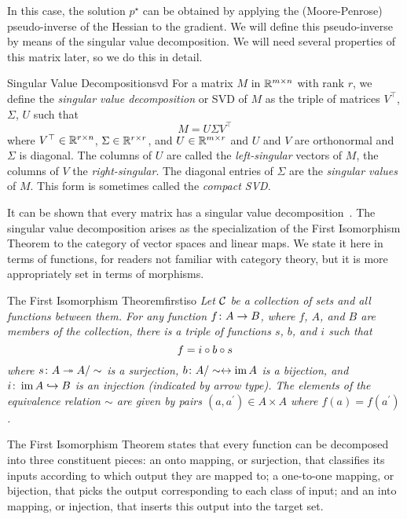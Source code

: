 \documentclass[../../thesis.tex]{subfiles}
\begin{document}
In this case, the solution $p^\star$
can be obtained by applying the
(Moore-Penrose) pseudo-inverse of the Hessian
to the gradient.
We will define this pseudo-inverse
by means of the singular value decomposition.
We will need several properties
of this matrix later,
so we do this in detail.

\begin{definition}{Singular Value Decomposition}{svd}
	For a matrix $M$ in $\mathbb{R}^{m \times n}$
	with rank $r$,
	we define the
	\emph{singular value decomposition} or SVD of $M$
	as the triple of matrices $V^\top$, $\Sigma$, $U$
	such that
	\begin{equation}
		M = U \Sigma V^\top
	\end{equation}
	where $V^\top \in \mathbb{R}^{r \times n}$,
	$\Sigma \in \mathbb{R}^{r \times r}$, and
	$U \in \mathbb{R}^{m \times r}$
	and $U$ and $V$ are orthonormal
	and $\Sigma$ is diagonal.
	The columns of $U$ are called the \emph{left-singular}
	vectors of $M$, the columns of $V$ the \emph{right-singular}.
	The diagonal entries of $\Sigma$ are the \emph{singular values} of $M$.
	This form is sometimes called the \emph{compact SVD}.
\end{definition}

It can be shown that every matrix has a
singular value decomposition~\cite{strang1993}.
The singular value decomposition arises
as the specialization of the First Isomorphism Theorem
to the category of vector spaces and linear maps.
We state it here in terms of functions,
for readers not familiar with category theory,
but it is more appropriately set in terms of morphisms.

\begin{theorem}{The First Isomorphism Theorem}{firstiso}
	\emph{Let ${\mathcal{C}}$ be a collection of sets and all functions between them.
	For any function $f\colon A \to B$, where $f$, $A$, and $B$ are members of the collection,
	there is a triple of functions $s$, $b$, and $i$ such that
	\begin{equation}
	      f = i \circ b \circ s
	\end{equation}
	where $s\colon A \twoheadrightarrow A/\sim$ is a surjection,
	$b\colon A/\sim \leftrightarrow \operatorname*{im} A$ is a bijection, and
	$i\colon \operatorname*{im} A \hookrightarrow B$ is an injection
	(indicated by arrow type).
	The elements of the equivalence relation $\sim$
	are given by pairs $(a, a^\prime) \in A \times A$
	where $f(a) = f(a^\prime)$.}
\end{theorem}

The First Isomorphism Theorem states that every function can be decomposed
into three constituent pieces:
an onto mapping, or surjection,
that classifies its inputs according to which output they are mapped to;
a one-to-one mapping, or bijection,
that picks the output corresponding to each class of input;
and an into mapping, or injection,
that inserts this output into the target set.
\end{document}
